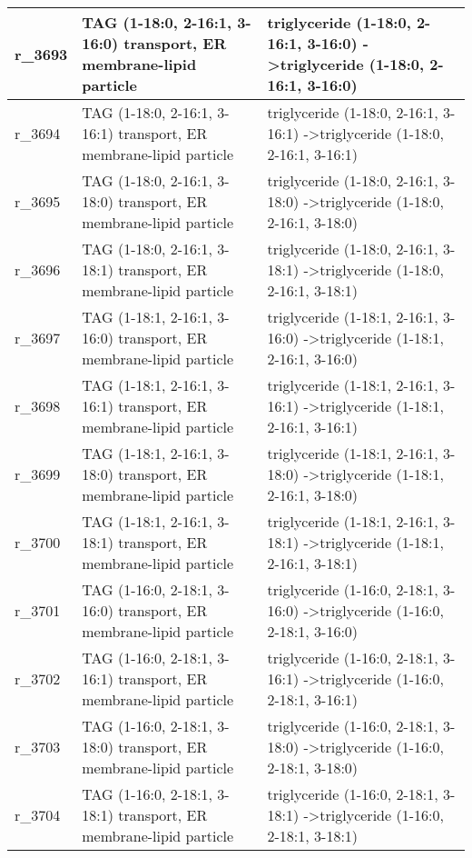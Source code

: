 \begin{landscape}
{\begin{longtable}{|l|p{7cm}|p{15cm}|}
r\_3693 & TAG (1-18:0, 2-16:1, 3-16:0) transport, ER membrane-lipid particle & triglyceride (1-18:0, 2-16:1, 3-16:0)  -\textgreater triglyceride (1-18:0, 2-16:1, 3-16:0) \\ \hline
r\_3694 & TAG (1-18:0, 2-16:1, 3-16:1) transport, ER membrane-lipid particle & triglyceride (1-18:0, 2-16:1, 3-16:1)  -\textgreater triglyceride (1-18:0, 2-16:1, 3-16:1) \\ \hline
r\_3695 & TAG (1-18:0, 2-16:1, 3-18:0) transport, ER membrane-lipid particle & triglyceride (1-18:0, 2-16:1, 3-18:0)  -\textgreater triglyceride (1-18:0, 2-16:1, 3-18:0) \\ \hline
r\_3696 & TAG (1-18:0, 2-16:1, 3-18:1) transport, ER membrane-lipid particle & triglyceride (1-18:0, 2-16:1, 3-18:1)  -\textgreater triglyceride (1-18:0, 2-16:1, 3-18:1) \\ \hline
r\_3697 & TAG (1-18:1, 2-16:1, 3-16:0) transport, ER membrane-lipid particle & triglyceride (1-18:1, 2-16:1, 3-16:0)  -\textgreater triglyceride (1-18:1, 2-16:1, 3-16:0) \\ \hline
r\_3698 & TAG (1-18:1, 2-16:1, 3-16:1) transport, ER membrane-lipid particle & triglyceride (1-18:1, 2-16:1, 3-16:1)  -\textgreater triglyceride (1-18:1, 2-16:1, 3-16:1) \\ \hline
r\_3699 & TAG (1-18:1, 2-16:1, 3-18:0) transport, ER membrane-lipid particle & triglyceride (1-18:1, 2-16:1, 3-18:0)  -\textgreater triglyceride (1-18:1, 2-16:1, 3-18:0) \\ \hline
r\_3700 & TAG (1-18:1, 2-16:1, 3-18:1) transport, ER membrane-lipid particle & triglyceride (1-18:1, 2-16:1, 3-18:1)  -\textgreater triglyceride (1-18:1, 2-16:1, 3-18:1) \\ \hline
r\_3701 & TAG (1-16:0, 2-18:1, 3-16:0) transport, ER membrane-lipid particle & triglyceride (1-16:0, 2-18:1, 3-16:0)  -\textgreater triglyceride (1-16:0, 2-18:1, 3-16:0) \\ \hline
r\_3702 & TAG (1-16:0, 2-18:1, 3-16:1) transport, ER membrane-lipid particle & triglyceride (1-16:0, 2-18:1, 3-16:1)  -\textgreater triglyceride (1-16:0, 2-18:1, 3-16:1) \\ \hline
r\_3703 & TAG (1-16:0, 2-18:1, 3-18:0) transport, ER membrane-lipid particle & triglyceride (1-16:0, 2-18:1, 3-18:0)  -\textgreater triglyceride (1-16:0, 2-18:1, 3-18:0) \\ \hline
r\_3704 & TAG (1-16:0, 2-18:1, 3-18:1) transport, ER membrane-lipid particle & triglyceride (1-16:0, 2-18:1, 3-18:1)  -\textgreater triglyceride (1-16:0, 2-18:1, 3-18:1) \\ \hline

\end{longtable}}
\end{landscape}
